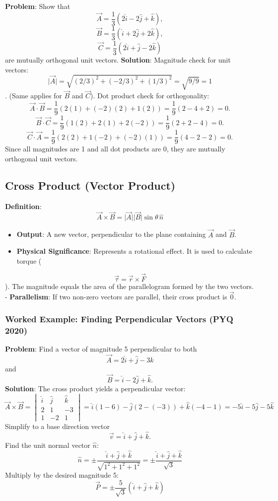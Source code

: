 \documentclass[
]{article}
\providecommand{\tightlist}{%
  \setlength{\itemsep}{0pt}\setlength{\parskip}{0pt}}
\begin{document}
\textbf{Problem}: Show that
\[
\vec{A} = \frac{1}{3}(2\hat{i} - 2\hat{j} + \hat{k}),
\]
\[
\vec{B} = \frac{1}{3}(\hat{i} + 2\hat{j} + 2\hat{k}),
\]
\[
\vec{C} = \frac{1}{3}(2\hat{i} + \hat{j} - 2\hat{k})
\]
are mutually orthogonal unit vectors. \textbf{Solution}: Magnitude check
for unit vectors:
\[
\lvert \vec{A} \rvert = \sqrt{(2/3)^2 + (-2/3)^2 + (1/3)^2} = \sqrt{9/9} = 1
\]
. (Same applies for \(\vec{B}\) and \(\vec{C}\)). Dot product check for
orthogonality:
\[
\vec{A} \cdot \vec{B} = \frac{1}{9}(2(1) + (-2)(2) + 1(2)) = \frac{1}{9}(2 - 4 + 2) = 0.
\]
\[
\vec{B} \cdot \vec{C} = \frac{1}{9}(1(2) + 2(1) + 2(-2)) = \frac{1}{9}(2 + 2 - 4) = 0.
\]
\[
\vec{C} \cdot \vec{A} = \frac{1}{9}(2(2) + 1(-2) + (-2)(1)) = \frac{1}{9}(4 - 2 - 2) = 0.
\]
Since all magnitudes are 1 and all dot products are 0, they are mutually
orthogonal unit vectors.

\subsection{Cross Product (Vector
Product)}\label{cross-product-vector-product}

\textbf{Definition}:
\[
\vec{A} \times \vec{B} = \lvert \vec{A} \rvert\lvert \vec{B} \rvert\sin\theta \, \hat{n}
\]
\begin{itemize}
\tightlist
\item
  \textbf{Output}: A new vector, perpendicular to the plane containing
  \(\vec{A}\) and \(\vec{B}\).
\item
  \textbf{Physical Significance}: Represents a rotational effect. It is
  used to calculate torque (
\end{itemize}
\[
\vec{\tau} = \vec{r} \times \vec{F}
\]
). The magnitude equals the area of the parallelogram formed by the two
vectors. - \textbf{Parallelism}: If two non-zero vectors are parallel,
their cross product is \(\vec{0}\).

\subsubsection{Worked Example: Finding Perpendicular Vectors (PYQ
2020)}\label{worked-example-finding-perpendicular-vectors-pyq-2020}

\textbf{Problem}: Find a vector of magnitude 5 perpendicular to both
\[
\vec{A} = 2\hat{i} + \hat{j} - 3\hat{k}
\]
and
\[
\vec{B} = \hat{i} - 2\hat{j} + \hat{k}.
\]
\textbf{Solution}: The cross product yields a perpendicular vector:
\[
\vec{A} \times \vec{B} =
\begin{vmatrix}
\hat{i} & \hat{j} & \hat{k} \\
2 & 1 & -3 \\
1 & -2 & 1
\end{vmatrix} = \hat{i}(1 - 6) - \hat{j}(2 - (-3)) + \hat{k}(-4 - 1) = -5\hat{i} - 5\hat{j} - 5\hat{k}
\]
Simplify to a base direction vector
\[
\vec{v} = \hat{i} + \hat{j} + \hat{k}.
\]
Find the unit normal vector \(\hat{n}\):
\[
\hat{n} = \pm \frac{\hat{i} + \hat{j} + \hat{k}}{\sqrt{1^2 + 1^2 + 1^2}} = \pm \frac{\hat{i} + \hat{j} + \hat{k}}{\sqrt{3}}
\]
Multiply by the desired magnitude 5:
\[
\vec{P} = \pm \frac{5}{\sqrt{3}}(\hat{i} + \hat{j} + \hat{k})
\]
\end{document}
